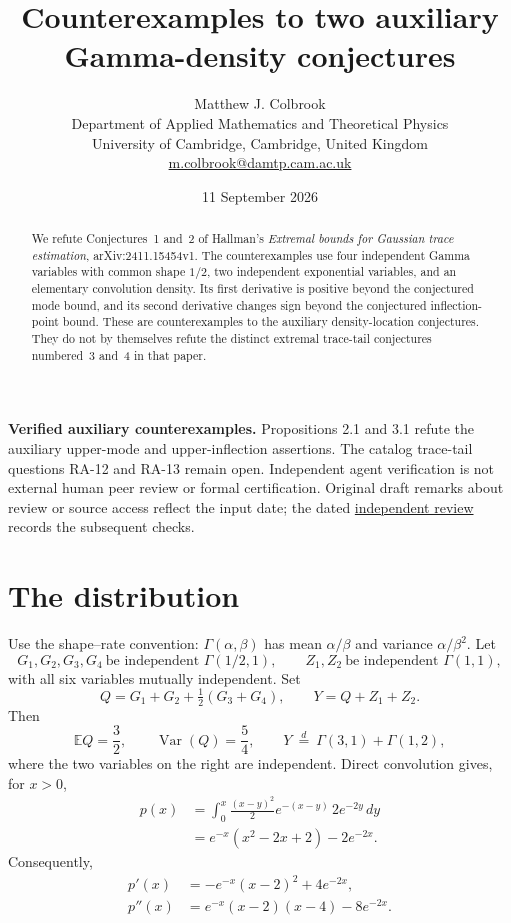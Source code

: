 \documentclass[11pt]{article}
\title{Counterexamples to two auxiliary Gamma-density conjectures}
\author{Matthew J. Colbrook\\\small Department of Applied Mathematics and Theoretical Physics\\\small University of Cambridge, Cambridge, United Kingdom\\\small\href{mailto:m.colbrook@damtp.cam.ac.uk}{m.colbrook@damtp.cam.ac.uk}}
\date{11 September 2026}
\theoremstyle{definition}
\newcommand{\E}{\mathbb E}
\begin{document}
\maketitle

\noindent\textbf{Verified auxiliary counterexamples.} Propositions 2.1 and 3.1 refute the auxiliary upper-mode and upper-inflection assertions. The catalog trace-tail questions RA-12 and RA-13 remain open.
Independent agent verification is not external human peer review or formal certification. Original draft remarks about review or source access reflect the input date; the dated \href{https://github.com/MColbrook/OpenProblemsInNLA/blob/codex/colbrook-transfer-resolutions/references/colbrook-transfer-2026-09-11/verification/reviews/gamma-auxiliary-review.md}{independent review} records the subsequent checks.
\par\medskip
\begin{abstract}
We refute Conjectures~1 and~2 of Hallman's \emph{Extremal bounds for Gaussian trace estimation}, arXiv:2411.15454v1. The counterexamples use four independent Gamma variables with common shape $1/2$, two independent exponential variables, and an elementary convolution density. Its first derivative is positive beyond the conjectured mode bound, and its second derivative changes sign beyond the conjectured inflection-point bound. These are counterexamples to the auxiliary density-location conjectures. They do not by themselves refute the distinct extremal trace-tail conjectures numbered~3 and~4 in that paper.
\end{abstract}

\section{The distribution}
Use the shape--rate convention: $\Gamma(\alpha,\beta)$ has mean $\alpha/\beta$ and variance $\alpha/\beta^2$. Let
\[
 G_1,G_2,G_3,G_4\ \text{be independent }\Gamma(1/2,1),
 \qquad Z_1,Z_2\ \text{be independent }\Gamma(1,1),
\]
with all six variables mutually independent. Set
\begin{equation}\label{eq:QY}
 Q=G_1+G_2+\tfrac12(G_3+G_4),\qquad Y=Q+Z_1+Z_2.
\end{equation}
Then
\[
 \E Q=\frac32,\qquad \operatorname{Var}(Q)=\frac54,
 \qquad Y\ \stackrel{d}=\ \Gamma(3,1)+\Gamma(1,2),
\]
where the two variables on the right are independent. Direct convolution gives, for $x>0$,
\begin{align}\label{eq:density}
 p(x)&=\int_0^x\frac{(x-y)^2}{2}e^{-(x-y)}\,2e^{-2y}\,dy\\
 &=e^{-x}(x^2-2x+2)-2e^{-2x}.\nonumber
\end{align}
Consequently,
\begin{align}
 p'(x)&=-e^{-x}(x-2)^2+4e^{-2x},\label{eq:first}\\
 p''(x)&=e^{-x}(x-2)(x-4)-8e^{-2x}.\label{eq:second}
\end{align}
\end{document}
